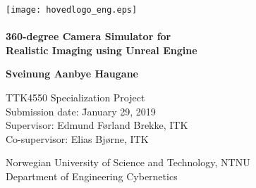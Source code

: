 \documentclass[pdftex,12pt,a4paper,twoside]{book}
\begin{document}
\begin{titlepage}
    \texttt{[image: hovedlogo\_eng.eps]} \hfill\\
    \vspace{2cm} \\
    
    {\Huge{\bfseries 360-degree Camera Simulator for\\Realistic Imaging using Unreal Engine}}
    
    \vspace{2cm}
    
    \Large{\textbf{Sveinung Aanbye Haugane}}
    
    \vfill
    \large{
        \begin{tabbing}
            TTK4550 Specialization Project \\
            Submission date:  \=January 29, 2019 \\
            Supervisor: \>Edmund Førland Brekke, ITK \\
            Co-supervisor: \>Elias Bjørne, ITK \\
        \end{tabbing}
        }
        \vspace{-1cm}
    \large{Norwegian University of Science and Technology, NTNU}\\
    \large{Department of Engineering Cybernetics}
    
\end{titlepage}





\tableofcontents
\clearpage
\printunsrtglossary[type=symbols,style=long,title={List of Symbols}]
\clearpage


\setcounter{page}{1}







%
\end{document}
